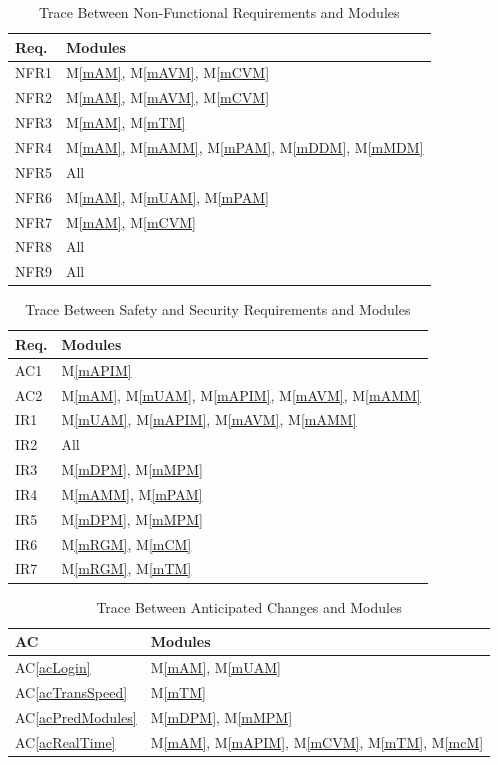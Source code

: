 \documentclass[12pt, titlepage]{article}
\newcommand{\acref}[1]{AC\ref{#1}}
\newcommand{\mref}[1]{M\ref{#1}}
\begin{document}
\begin{table}[H]
\centering
\begin{tabular}{p{} p{}}
\toprule
\textbf{Req.} & \textbf{Modules}\\
\midrule
NFR1 & \mref{mAM}, \mref{mAVM}, \mref{mCVM}\\
NFR2 & \mref{mAM}, \mref{mAVM}, \mref{mCVM}\\
NFR3 & \mref{mAM}, \mref{mTM}\\
NFR4 & \mref{mAM}, \mref{mAMM}, \mref{mPAM}, \mref{mDDM}, \mref{mMDM}\\
NFR5 & All \\
NFR6 & \mref{mAM}, \mref{mUAM}, \mref{mPAM}\\
NFR7 & \mref{mAM}, \mref{mCVM}\\
NFR8 & All \\
NFR9 & All \\
\bottomrule
\end{tabular}
\caption{Trace Between Non-Functional Requirements and Modules}
\label{TblRT}
\end{table}


\begin{table}[H]
\centering
\begin{tabular}{p{} p{}}
\toprule
\textbf{Req.} & \textbf{Modules}\\
\midrule
AC1 & \mref{mAPIM}\\
AC2 & \mref{mAM}, \mref{mUAM}, \mref{mAPIM}, \mref{mAVM}, \mref{mAMM}\\
IR1 & \mref{mUAM}, \mref{mAPIM}, \mref{mAVM}, \mref{mAMM}\\
IR2 & All \\
IR3 & \mref{mDPM}, \mref{mMPM}\\
IR4 & \mref{mAMM}, \mref{mPAM}\\
IR5 & \mref{mDPM}, \mref{mMPM}\\
IR6 & \mref{mRGM}, \mref{mCM}\\
IR7 & \mref{mRGM}, \mref{mTM}\\
\bottomrule
\end{tabular}
\caption{Trace Between Safety and Security Requirements and Modules}
\label{TblRT}
\end{table}

\begin{table}[H]
\centering
\begin{tabular}{p{} p{}}
\toprule
\textbf{AC} & \textbf{Modules}\\
\midrule
\acref{acLogin} & \mref{mAM}, \mref{mUAM}\\
\acref{acTransSpeed} & \mref{mTM}\\
\acref{acPredModules} & \mref{mDPM}, \mref{mMPM}\\
\acref{acRealTime} & \mref{mAM}, \mref{mAPIM}, \mref{mCVM}, \mref{mTM}, \mref{mcM}\\
\bottomrule
\end{tabular}
\caption{Trace Between Anticipated Changes and Modules}
\label{TblACT}
\end{table}
\end{document}
